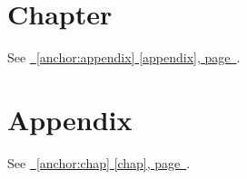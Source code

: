 \documentclass{book}
\newcommand{\Texinfothechapterheading}{}
\newcommand{\Texinfoheadingchaptername}{\chaptername}
\newcommand{\Texinfochapter}[1]{\chapter{#1}
\renewcommand{\Texinfothechapterheading}{\Texinfoheadingchaptername{} \thechapter{} }%
}%
\renewcommand{\_}{\Texinfounderscore\discretionary{}{}{}}
\begin{document}
\label{anchor:Top}%
\Texinfochapter{{Chapter}}
\label{anchor:chap}%

See \hyperref[anchor:appendix]{\appendixname~\ref*{anchor:appendix} [appendix], page~\pageref*{anchor:appendix}}.

\appendix
\renewcommand{\Texinfoheadingchaptername}{\appendixname}
\Texinfochapter{{Appendix}}
\label{anchor:appendix}%

See \hyperref[anchor:chap]{\chaptername~\ref*{anchor:chap} [chap], page~\pageref*{anchor:chap}}.
\end{document}

